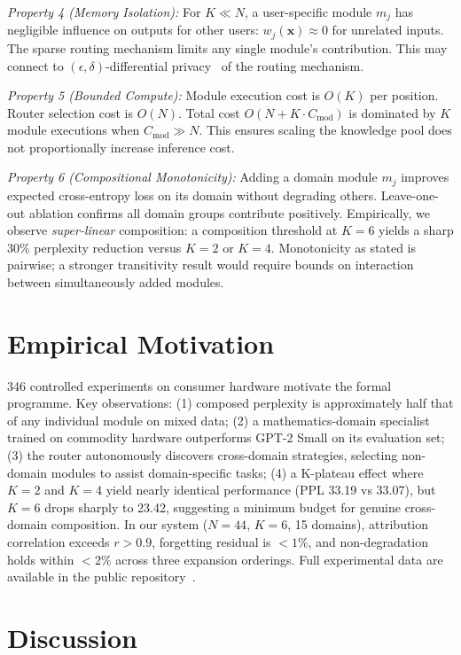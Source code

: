 \documentclass[conference]{IEEEtran}
\begin{document}
\emph{Property 4 (Memory Isolation):} For $K \ll N$, a user-specific module $m_j$ has negligible influence on outputs for other users: $w_j(\mathbf{x}) \approx 0$ for unrelated inputs. The sparse routing mechanism limits any single module's contribution. This may connect to $(\epsilon, \delta)$-differential privacy~\cite{dwork2014algorithmic} of the routing mechanism.

\emph{Property 5 (Bounded Compute):} Module execution cost is $O(K)$ per position. Router selection cost is $O(N)$. Total cost $O(N + K \cdot C_{\text{mod}})$ is dominated by $K$ module executions when $C_{\text{mod}} \gg N$. This ensures scaling the knowledge pool does not proportionally increase inference cost.

\emph{Property 6 (Compositional Monotonicity):} Adding a domain module $m_j$ improves expected cross-entropy loss on its domain without degrading others. Leave-one-out ablation confirms all domain groups contribute positively. Empirically, we observe \emph{super-linear} composition: a composition threshold at $K{=}6$ yields a sharp 30\% perplexity reduction versus $K{=}2$ or $K{=}4$. Monotonicity as stated is pairwise; a stronger transitivity result would require bounds on interaction between simultaneously added modules.

\section{Empirical Motivation}

346 controlled experiments on consumer hardware motivate the formal programme. Key observations: (1) composed perplexity is approximately half that of any individual module on mixed data; (2) a mathematics-domain specialist trained on commodity hardware outperforms GPT-2 Small on its evaluation set; (3) the router autonomously discovers cross-domain strategies, selecting non-domain modules to assist domain-specific tasks; (4) a K-plateau effect where $K{=}2$ and $K{=}4$ yield nearly identical performance (PPL 33.19 vs 33.07), but $K{=}6$ drops sharply to 23.42, suggesting a minimum budget for genuine cross-domain composition. In our system ($N{=}44$, $K{=}6$, 15 domains), attribution correlation exceeds $r > 0.9$, forgetting residual is ${<}1\%$, and non-degradation holds within ${<}2\%$ across three expansion orderings. Full experimental data are available in the public repository~\cite{schulte2026zenodo}.

\section{Discussion}
\end{document}
